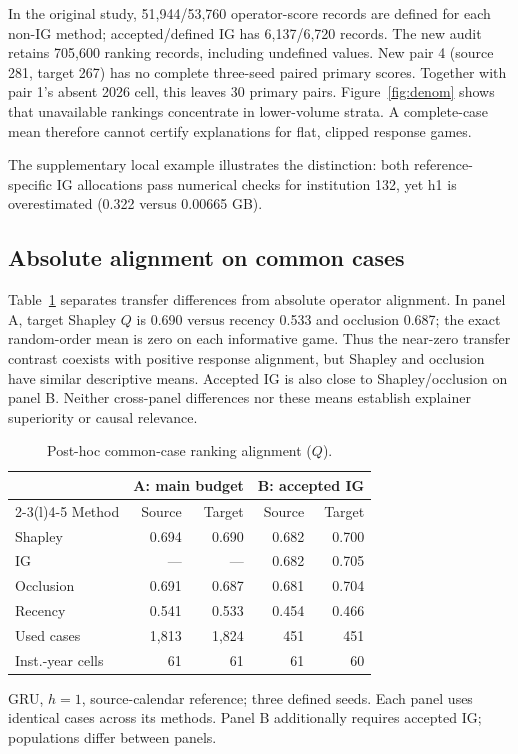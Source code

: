 \documentclass[conference]{IEEEtran}
\begin{document}
In the original study, 51,944/53,760 operator-score records are defined for each non-IG method; accepted/defined IG has 6,137/6,720 records. The new audit retains 705,600 ranking records, including undefined values. New pair 4 (source 281, target 267) has no complete three-seed paired primary scores. Together with pair 1's absent 2026 cell, this leaves 30 primary pairs. Figure~\ref{fig:denom} shows that unavailable rankings concentrate in lower-volume strata. A complete-case mean therefore cannot certify explanations for flat, clipped response games.



The supplementary local example illustrates the distinction: both reference-specific IG allocations pass numerical checks for institution 132, yet h1 is overestimated (0.322 versus 0.00665 GB).




\subsection{Absolute alignment on common cases}
Table~\ref{tab:methods} separates transfer differences from absolute operator alignment. In panel A, target Shapley $Q$ is 0.690 versus recency 0.533 and occlusion 0.687; the exact random-order mean is zero on each informative game. Thus the near-zero transfer contrast coexists with positive response alignment, but Shapley and occlusion have similar descriptive means. Accepted IG is also close to Shapley/occlusion on panel B. Neither cross-panel differences nor these means establish explainer superiority or causal relevance.

\begin{table}[t]\centering
\caption{Post-hoc common-case ranking alignment ($Q$).}\label{tab:methods}
\small
\renewcommand{\arraystretch}{1.15}
\begin{tabular*}{\columnwidth}{@{\extracolsep{\fill}}lrrrr@{}}\toprule
&\multicolumn{2}{c}{A: main budget}&\multicolumn{2}{c}{B: accepted IG}\\
\cmidrule(lr){2-3}\cmidrule(l){4-5}
Method&Source&Target&Source&Target\\\midrule
Shapley&0.694&0.690&0.682&0.700\\
IG&---&---&0.682&0.705\\
Occlusion&0.691&0.687&0.681&0.704\\
Recency&0.541&0.533&0.454&0.466\\\midrule
Used cases&1,813&1,824&451&451\\
Inst.-year cells&61&61&61&60\\\bottomrule
\end{tabular*}
\par\smallskip\raggedright\footnotesize
GRU, $h=1$, source-calendar reference; three defined seeds. Each panel uses identical cases across its methods. Panel B additionally requires accepted IG; populations differ between panels.
\end{table}
\end{document}
